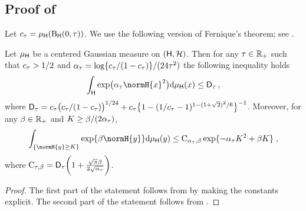 \subsection{Proof of }
\label{subsec:prop:pCN}
Let $c_\tau = \mu_{\mathsf{H}}(\operatorname{B}_{\mathsf{H}}(0,\tau))$. We use the following version of Fernique's theorem; see \citep[Theorem~2.8.5]{bogachev:1998}.
\begin{lemma}
\label{lem:bogachev:fernique}
Let $\mu_{\mathsf{H}}$ be a centered Gaussian measure on  $(\mathsf{H},\mathcal{H})$. Then for any $\tau \in \mathbb{R}_{+}$ such that $c_\tau > 1/2$ and $\alpha_{\tau} = \log\{c_\tau/(1-c_\tau)\}/(24\tau^2)$ the following inequality holds
\begin{equation*}
\int_{\msh} \exp\bigl(\alphagaus \normH{x}^2\bigr) \rmd\muH(x) \leq \Constexpmoment_{\tau}\,,
\end{equation*}
where $\mathsf{D}_{\tau} = c_\tau\bigl(c_\tau/(1-c_\tau)\bigr)^{1/24} + c_\tau\bigl\{1 - (1/c_\tau - 1)^{1 - (1+\sqrt{2})^2/6}\bigr\}^{-1}$. Moreover, for any $\beta \in \mathbb{R}_{+}$ and $K \geq \beta/(2\alpha_{\tau})$,
\begin{equation*}
\int_{\{\normH{y} \geq K\}}\exp\{\betagaus\normH{y}\}\rmd\muH(y) \leq \ConstC_{\alphagaus,\betagaus}\exp\{-\alphagaus K^2 + \betagaus K\}\eqsp,
\end{equation*}
where $\operatorname{C}_{\tau,\beta} = \mathsf{D}_{\tau}\biggl(1 + \frac{\sqrt{\pi}\beta}{2\sqrt{\alpha_{\tau}}}\biggr)$.
\end{lemma}
\begin{proof}
The first part of the statement follows from \cite[Theorem~2.8.5]{bogachev:1998} by making the constants explicit. The second part of the statement follows from \cite[Proposition~$A.1.$]{hairer:stuart:vollmer:2012}.
\end{proof}

